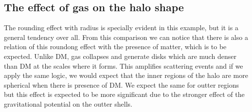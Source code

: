 \subsection{The effect of gas on the halo shape}
The rounding effect with radius is specially evident in this example, but it is a general tendency over all. From this comparison we can notice that there is also a relation of this roundong effect with the presence of matter, which is to be expected. Unlike DM, gas collapses and generate disks which are much denser than DM at the scales where it forms. This amplifies scattering events and if we apply the same logic, we would expect that the inner regions of the halo are more spherical when there is presence of DM. We expect the same for outter regions but this effect is expected to be more significant due to the stronger effect of the gravitational potential on the outter shells.\\

